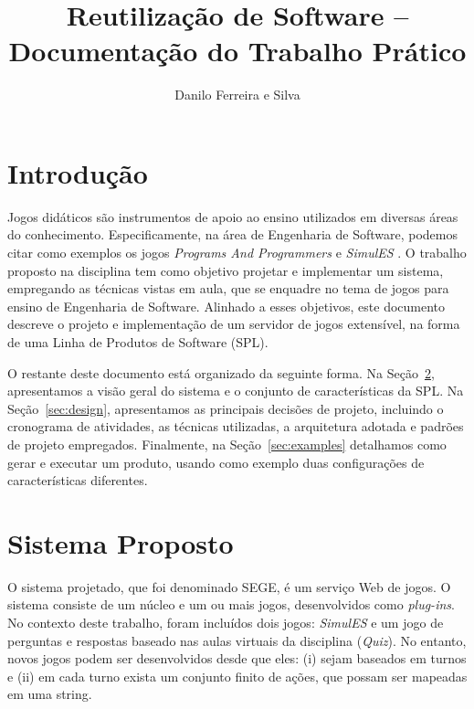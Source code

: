 \documentclass[12pt]{article}
\title{Reutilização de Software -- Documentação do Trabalho Prático}
\author{Danilo Ferreira e Silva\inst{1}}
\begin{document}
 

\maketitle



\section{Introdução}

Jogos didáticos são instrumentos de apoio ao ensino utilizados em diversas áreas do conhecimento. Especificamente, na área de Engenharia de Software, podemos citar como exemplos os jogos \emph{Programs And Programmers} \cite{baker2005pnp} e \mbox{\emph{SimulES}} \cite{figueiredo2007simules}. O trabalho proposto na disciplina tem como objetivo projetar e implementar um sistema, empregando as técnicas vistas em aula, que se enquadre no tema de jogos para ensino de Engenharia de Software.
Alinhado a esses objetivos, este documento descreve o projeto e implementação de um servidor de jogos extensível, na forma de uma Linha de Produtos de Software (SPL).

O restante deste documento está organizado da seguinte forma. Na Seção~\ref{sec:requisites}, apresentamos a visão geral do sistema e o conjunto de características da SPL. Na Seção~\ref{sec:design}, apresentamos as principais decisões de projeto, incluindo o cronograma de atividades, as técnicas utilizadas, a arquitetura adotada e padrões de projeto empregados. Finalmente, na Seção~\ref{sec:examples} detalhamos como gerar e executar um produto, usando como exemplo duas configurações de características diferentes.


\section{Sistema Proposto}
\label{sec:requisites}

O sistema projetado, que foi denominado SEGE, é um serviço Web de jogos. O sistema consiste de um núcleo e um ou mais jogos, desenvolvidos como \emph{plug-ins}. No contexto deste trabalho, foram incluídos dois jogos: \emph{SimulES} e um jogo de perguntas e respostas baseado nas aulas virtuais da disciplina (\emph{Quiz}). No entanto, novos jogos podem ser desenvolvidos desde que eles: (i) sejam baseados em turnos e (ii) em cada turno exista um conjunto finito de ações, que possam ser mapeadas em uma string.
\end{document}
